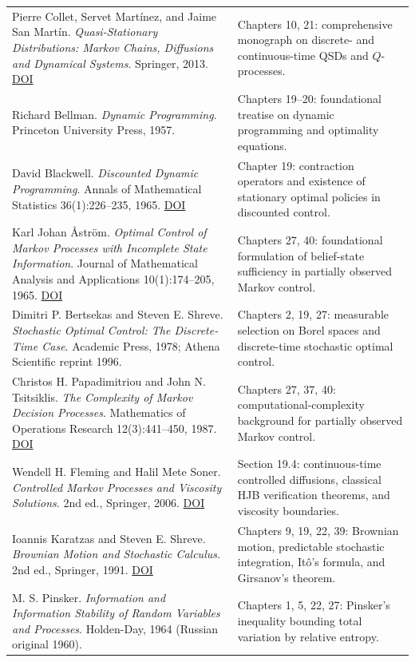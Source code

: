 \documentclass[
  english,
  11pt,
  oneside]{book}
\begin{document}
{\begin{longtable}[]{@{}
  >{\raggedright\arraybackslash}p{}
  >{\raggedright\arraybackslash}p{}@{}}
Pierre Collet, Servet Martínez, and Jaime San Martín. \emph{Quasi-Stationary Distributions: Markov Chains, Diffusions and Dynamical Systems}. Springer, 2013. \href{https://doi.org/10.1007/978-3-642-33131-2}{DOI} & Chapters 10, 21: comprehensive monograph on discrete- and continuous-time QSDs and \(Q\)-processes. \\
Richard Bellman. \emph{Dynamic Programming}. Princeton University Press, 1957. & Chapters 19--20: foundational treatise on dynamic programming and optimality equations. \\
David Blackwell. \emph{Discounted Dynamic Programming}. Annals of Mathematical Statistics 36(1):226--235, 1965. \href{https://doi.org/10.1214/aoms/1177700285}{DOI} & Chapter 19: contraction operators and existence of stationary optimal policies in discounted control. \\
Karl Johan Åström. \emph{Optimal Control of Markov Processes with Incomplete State Information}. Journal of Mathematical Analysis and Applications 10(1):174--205, 1965. \href{https://doi.org/10.1016/0022-247X(65)90154-X}{DOI} & Chapters 27, 40: foundational formulation of belief-state sufficiency in partially observed Markov control. \\
Dimitri P. Bertsekas and Steven E. Shreve. \emph{Stochastic Optimal Control: The Discrete-Time Case}. Academic Press, 1978; Athena Scientific reprint 1996. & Chapters 2, 19, 27: measurable selection on Borel spaces and discrete-time stochastic optimal control. \\
Christos H. Papadimitriou and John N. Tsitsiklis. \emph{The Complexity of Markov Decision Processes}. Mathematics of Operations Research 12(3):441--450, 1987. \href{https://doi.org/10.1287/moor.12.3.441}{DOI} & Chapters 27, 37, 40: computational-complexity background for partially observed Markov control. \\
Wendell H. Fleming and Halil Mete Soner. \emph{Controlled Markov Processes and Viscosity Solutions}. 2nd ed., Springer, 2006. \href{https://doi.org/10.1007/0-387-31071-1}{DOI} & Section 19.4: continuous-time controlled diffusions, classical HJB verification theorems, and viscosity boundaries. \\
Ioannis Karatzas and Steven E. Shreve. \emph{Brownian Motion and Stochastic Calculus}. 2nd ed., Springer, 1991. \href{https://doi.org/10.1007/978-1-4612-0949-2}{DOI} & Chapters 9, 19, 22, 39: Brownian motion, predictable stochastic integration, Itô's formula, and Girsanov's theorem. \\
M. S. Pinsker. \emph{Information and Information Stability of Random Variables and Processes}. Holden-Day, 1964 (Russian original 1960). & Chapters 1, 5, 22, 27: Pinsker's inequality bounding total variation by relative entropy. \\

\end{longtable}}
\end{document}
